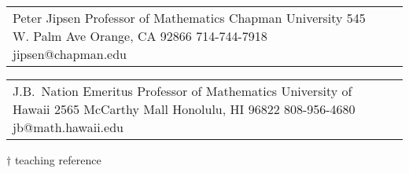 {    \begin{tabular}{@{}p{6cm}p{6cm}}
          {Peter Jipsen}
          {Professor of Mathematics}
          {Chapman University}
          {545 W. Palm Ave}
          {Orange, CA 92866}
          {714-744-7918}
          {jipsen@chapman.edu}
    \end{tabular}
    \begin{tabular}{@{}p{6cm}p{6cm}}
          {J.B.~Nation}
          {Emeritus Professor of Mathematics}
          {University of Hawaii}
          {2565 McCarthy Mall}
          {Honolulu, HI 96822}
          {808-956-4680}
          {jb@math.hawaii.edu}
    \end{tabular}
}

    $\dag$ teaching reference

